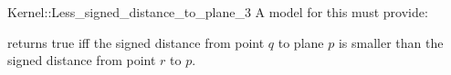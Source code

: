 \begin{ccRefFunctionObjectConcept}{Kernel::Less_signed_distance_to_plane_3}
A model for this must provide:


{returns true iff the signed distance from point $q$ to plane $p$ is
smaller than the signed distance from point $r$ to $p$.}

\end{ccRefFunctionObjectConcept}

